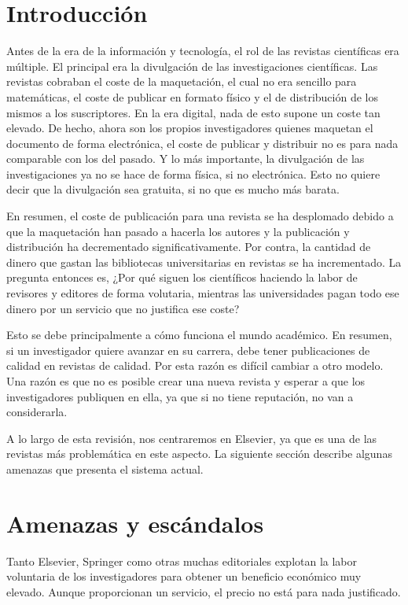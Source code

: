 \section{Introducción}

Antes de la era de la información y tecnología, el rol de las revistas científicas era múltiple. El principal era la divulgación de las investigaciones científicas. Las revistas cobraban el coste de la maquetación, el cual no era sencillo para matemáticas, el coste de publicar en formato físico y el de distribución de los mismos a los suscriptores. En la era digital, nada de esto supone un coste tan elevado. De hecho, ahora son los propios investigadores quienes maquetan el documento de forma electrónica, el coste de publicar y distribuir no es para nada comparable con los del pasado. Y lo más importante, la divulgación de las investigaciones ya no se hace de forma física, si no electrónica. Esto no quiere decir que la divulgación sea gratuita, si no que es mucho más barata.

En resumen, el coste de publicación para una revista se ha desplomado debido a que la maquetación han pasado a hacerla los autores y la publicación y distribución ha decrementado significativamente. Por contra, la cantidad de dinero que gastan las bibliotecas universitarias en revistas se ha incrementado. La pregunta entonces es, ¿Por qué siguen los científicos haciendo la labor de revisores y editores de forma volutaria, mientras las universidades pagan todo ese dinero por un servicio que no justifica ese coste?

Esto se debe principalmente a cómo funciona el mundo académico. En resumen, si un investigador quiere avanzar en su carrera, debe tener publicaciones de calidad en revistas de calidad. Por esta razón es difícil cambiar a otro modelo. Una razón es que no es posible crear una nueva revista y esperar a que los investigadores publiquen en ella, ya que si no tiene reputación, no van a considerarla.

A lo largo de esta revisión, nos centraremos en Elsevier\cite{costknowledge}, ya que es una de las revistas más problemática en este aspecto. La siguiente sección describe algunas amenazas que presenta el sistema actual.

\section{Amenazas y escándalos}

Tanto Elsevier, Springer como otras muchas editoriales explotan la labor voluntaria de los investigadores para obtener un beneficio económico muy elevado. Aunque proporcionan un servicio, el precio no está para nada justificado.

